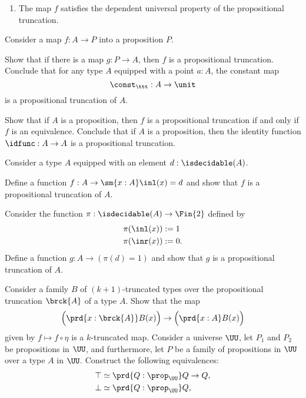 \begin{exercises}
\begin{enumerate}
  \item\label{item:dup-dup-trunc-Prop} The map $f$ satisfies the dependent universal property of the propositional truncation.
  \end{enumerate}
  \exitem Consider a map $f:A\to P$ into a proposition $P$.
  \begin{subexenum}
  \item Show that if there is a map $g:P\to A$, then $f$ is a propositional truncation. Conclude that for any type $A$ equipped with a point $a:A$, the constant map
    \begin{equation*}
      \const_\ttt: A\to\unit
    \end{equation*}
    is a propositional truncation of $A$.
  \item Show that if $A$ is a proposition, then $f$ is a propositional truncation if and only if $f$ is an equivalence. Conclude that if $A$ is a proposition, then the identity function $\idfunc:A\to A$ is a propositional truncation.
  \end{subexenum}
  \exitem Consider a type $A$ equipped with an element $d:\isdecidable(A)$.
  \begin{subexenum}
  \item Define a function $f:A\to \sm{x:A}\inl(x)=d$ and show that $f$ is a propositional truncation of $A$.
  \item Consider the function $\pi:\isdecidable(A)\to\Fin{2}$ defined by
    \begin{align*}
      \pi(\inl(x)) & := 1 \\
      \pi(\inr(x)) & := 0.
    \end{align*}
    Define a function $g:A\to (\pi(d)=1)$ and show that $g$ is a propositional truncation of $A$.
  \end{subexenum}
  \exitem Consider a family $B$ of $(k+1)$-truncated types over the propositional truncation $\brck{A}$ of a type $A$. Show that the map
  \begin{equation*}
    \Big(\prd{x:\brck{A}}B(x)\Big)\to\Big(\prd{x:A}B(x)\Big)
  \end{equation*}
  given by $f\mapsto f\circ\eta$ is a $k$-truncated map.
  \exitem Consider a universe $\UU$, let $P_1$ and $P_2$ be propositions in $\UU$, and furthermore, let $P$ be a family of propositions in $\UU$ over a type $A$ in $\UU$. Construct the following equivalences:
    \begin{align*}
      \top & \simeq \prd{Q:\prop_\UU}Q\to Q,\\
      \bot & \simeq \prd{Q:\prop_\UU}Q,\\

\end{align*}
\end{exercises}
